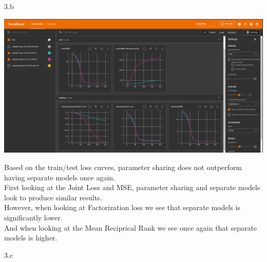 \clearpage

\LARGE
3.b
\normalsize

\begin{answer}
	\begin{center}
		\includegraphics[width=1.0\textwidth]{LF05LR05}
	\end{center}
	Based on the train/test loss curves, parameter sharing does not outperform having separate models once again. \\
	First looking at the Joint Loss and MSE, parameter sharing and separate models look to produce similar results. \\
	However, when looking at Factorization loss we see that separate models is significantly lower. \\
	And when looking at the Mean Reciprical Rank we see once again that separate models is higher.
\end{answer}

\clearpage

\LARGE
3.c
\normalsize

